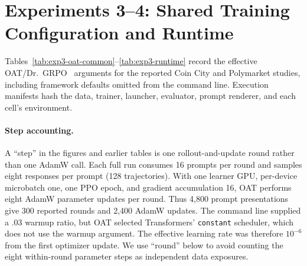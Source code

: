\section{Experiments 3--4: Shared Training Configuration and Runtime}
\label{app:exp3-complete-training-setup}

Tables~\ref{tab:exp3-oat-common}--\ref{tab:exp3-runtime} record the effective
OAT/Dr.~GRPO~\citep{liu2024oat} arguments for the reported Coin City and Polymarket studies, including framework defaults omitted from the command line.
Execution manifests hash the data, trainer, launcher, evaluator, prompt
renderer, and each cell's environment.

\paragraph{Step accounting.}
A ``step'' in the figures and earlier tables is one rollout-and-update round rather than one
AdamW call.  Each full run consumes 16 prompts per round and samples eight responses
per prompt (128 trajectories).  With one learner GPU, per-device microbatch one, one
PPO epoch, and gradient accumulation 16, OAT performs eight AdamW parameter updates per
round. Thus 4,800 prompt presentations give 300 reported rounds and 2,400 AdamW
updates. The command line supplied a .03 warmup ratio, but OAT selected
Transformers' \texttt{constant} scheduler, which does not use the warmup argument.
The effective learning rate was therefore $10^{-6}$ from the first optimizer
update. We use ``round'' below to avoid counting the eight within-round parameter
steps as independent data exposures.

